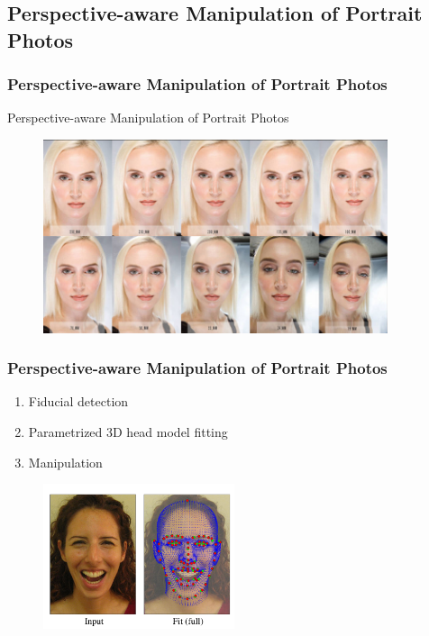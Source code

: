 \subsection{Perspective-aware Manipulation of Portrait Photos}
\frame
{
	\frametitle{Perspective-aware Manipulation of Portrait Photos}
	Perspective-aware Manipulation of Portrait Photos \cite{Fried:2016}
	
	\begin{figure}
		\centering
		\includegraphics[width=0.9\textwidth]{img/perspective/portraitlens.jpg}
	\end{figure}
}

\frame
{
	\frametitle{Perspective-aware Manipulation of Portrait Photos}
	
	
	\begin{enumerate}
		\item Fiducial detection
		\item Parametrized 3D head model fitting
		\item Manipulation
	\end{enumerate}
	
	\begin{figure}
		\centering
		\includegraphics[width=0.5\textwidth]{img/perspective/fit.png}
	\end{figure}
}

